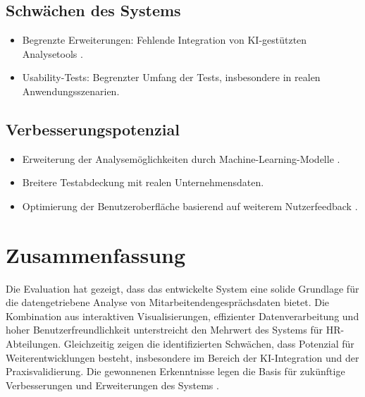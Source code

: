 \subsection{Schw\"achen des Systems}
\begin{itemize}
    \item Begrenzte Erweiterungen: Fehlende Integration von KI-gest\"utzten Analysetools \cite{tambe2019artificial}.
    \item Usability-Tests: Begrenzter Umfang der Tests, insbesondere in realen Anwendungsszenarien.
\end{itemize}

\subsection{Verbesserungspotenzial}
\begin{itemize}
    \item Erweiterung der Analysem\"oglichkeiten durch Machine-Learning-Modelle \cite{aral2012threeway}.
    \item Breitere Testabdeckung mit realen Unternehmensdaten.
    \item Optimierung der Benutzeroberfl\"ache basierend auf weiterem Nutzerfeedback \cite{sedlmair2011information}.
\end{itemize}

\section{Zusammenfassung}
Die Evaluation hat gezeigt, dass das entwickelte System eine solide Grundlage f\"ur die datengetriebene Analyse von Mitarbeitendengespr\"achs\-daten bietet. Die Kombination aus interaktiven Visualisierungen, effizienter Datenverarbeitung und hoher Benutzerfreundlichkeit unterstreicht den Mehrwert des Systems f\"ur HR-Abteilungen. Gleichzeitig zeigen die identifizierten Schw\"achen, dass Potenzial f\"ur Weiterentwicklungen besteht, insbesondere im Bereich der KI-Integration und der Praxisvalidierung. Die gewonnenen Erkenntnisse legen die Basis f\"ur zuk\"unftige Verbesserungen und Erweiterungen des Systems \cite{burnett2021future}.

